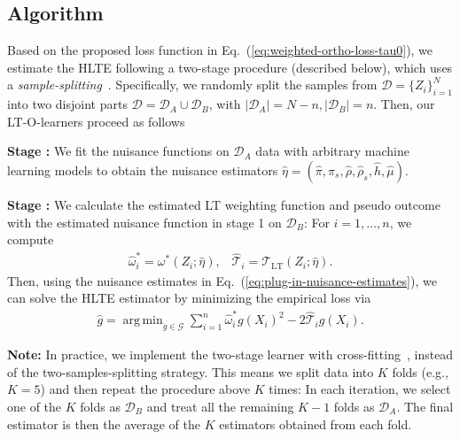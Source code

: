 \documentclass{article}
\theoremstyle{plain}
\theoremstyle{definition}
\theoremstyle{remark}
\newcommand{\1}{\mathds{1}}                %
\DeclareMathOperator*{\argmin}{arg\,min}
\newcommand{\circlednumblue}[1]{%
  \tikz[baseline=(char.base)]{
    \node[shape=circle,draw=blue!50!black,fill=blue!10,inner sep=1pt] (char) {\small \textbf{#1}};
  }%
}
\newcommand{\methods}{LT-O-learners\xspace}
\begin{document}

\subsection{Algorithm}
\label{subsec:estimating-hlte}

Based on the proposed loss function in Eq.~(\ref{eq:weighted-ortho-loss-tau0}), we estimate the HLTE following a two-stage procedure (described below), which uses a \emph{sample-splitting}~\cite{Chernozhukov.2018, Kennedy.2023, Morzywolek.2023, Foster.2023}. %
Specifically, we randomly split the samples from $\mathcal{D}=\{Z_i\}_{i=1}^{N}$ into two disjoint parts $\mathcal{D}=\mathcal{D}_A \cup \mathcal{D}_B$, with $|\mathcal{D}_A|=N-n, |\mathcal{D}_B|=n$. Then, our \methods proceed as follows

\textbf{Stage \circlednumblue{1}:} We fit the nuisance functions on $\mathcal{D}_A$ data with arbitrary machine learning models to obtain the nuisance estimators $\hat\eta=(\hat\pi, \hat\pi_s,\hat\rho,\hat\rho_s, \hat{h}, \hat\mu)$. %

\textbf{Stage \circlednumblue{2}:} We calculate the estimated LT weighting function and pseudo outcome with the estimated nuisance function in stage 1 on $\mathcal{D}_B$: For $i=1, \ldots ,n$, we compute
\begin{align}
\label{eq:plug-in-nuisance-estimates}
    \hat\omega^*_i=\omega^*(Z_i;\hat\eta), \;\;\; \hat{\mathcal{T}}_i=\mathcal{T}_\mathrm{LT}(Z_i;\hat\eta).
\end{align}
Then, using the nuisance estimates in Eq.~(\ref{eq:plug-in-nuisance-estimates}), we can solve the HLTE estimator by minimizing the empirical loss via
\begin{align}
\label{eq:empirical-loss}
    \hat{g}=\argmin_{g\in\mathcal{G}} \sum_{i=1}^n \hat\omega^*_i g(X_i)^2- 2\hat{\mathcal{T}}_i g(X_i) .
\end{align}

\textbf{Note:} In practice, we implement the two-stage learner with cross-fitting~\cite{Chernozhukov.2018}, instead of the two-samples-splitting strategy. This means we split data into $K$ folds (e.g., $K=5$) and then repeat the procedure above $K$ times: In each iteration, we select one of the $K$ folds as $\mathcal{D}_B$ and treat all the remaining $K-1$ folds as $\mathcal{D}_A$. The final estimator is then the average of the $K$ estimators obtained from each fold.
\end{document}
